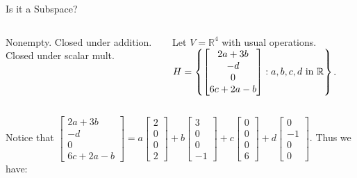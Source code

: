 \documentclass[xcolor=dvipsnames,aspectratio=169,t]{beamer}
\begin{document}
\begin{frame}{Is it a Subspace?}

\begin{columns}[T]

\column{0.35\tw}

\bb
\item Nonempty.
\ii Closed under addition.
\ii Closed under scalar mult.
\ee

\column{0.65\tw}

Let $V = \mathbb{R}^4$ with usual operations. $\displaystyle H =  \left\{ \begin{bmatrix} 2a + 3b \\ -d \\ 0 \\ 6c+2a-b \end{bmatrix} : a, b, c, d \mbox{ in }  \mathbb{R}  \right\}$.

\end{columns}

\vspace{0.2in}

\pause
{\small Notice that $\begin{bmatrix} 2a + 3b \\ -d \\ 0 \\ 6c+2a-b \end{bmatrix} = a \begin{bmatrix} 2 \\ 0 \\ 0 \\ 2 \end{bmatrix} + b \begin{bmatrix} 3 \\ 0 \\ 0 \\ -1 \end{bmatrix} + c \begin{bmatrix} 0 \\ 0 \\ 0 \\ 6 \end{bmatrix} + d  \begin{bmatrix} 0 \\ -1 \\ 0 \\ 0 \end{bmatrix}$. Thus we have:} \ms


\end{frame}
\end{document}
